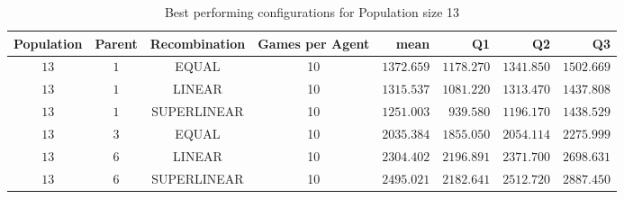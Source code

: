 
\begin{table}[H]
\centering
\small
\begin{tabular}{c c c c r r r r}
Population & Parent & Recombination & Games per Agent & mean & Q1 & Q2 & Q3\\
\hline
$13$ & $1$ & EQUAL & 10 & $1372.659$ & $1178.270$ & $1341.850$ & $1502.669$\\
$13$ & $1$ & LINEAR & 10 & $1315.537$ & $1081.220$ & $1313.470$ & $1437.808$\\
$13$ & $1$ & SUPERLINEAR & 10 & $1251.003$ & $939.580$ & $1196.170$ & $1438.529$\\
$13$ & $3$ & EQUAL & 10 & $2035.384$ & $1855.050$ & $2054.114$ & $2275.999$\\
$13$ & $6$ & LINEAR & 10 & $2304.402$ & $2196.891$ & $2371.700$ & $2698.631$\\
$13$ & $6$ & SUPERLINEAR & 10 & $2495.021$ & $2182.641$ & $2512.720$ & $2887.450$\\
\end{tabular}
\caption{Best performing configurations for Population size 13}
\end{table}

